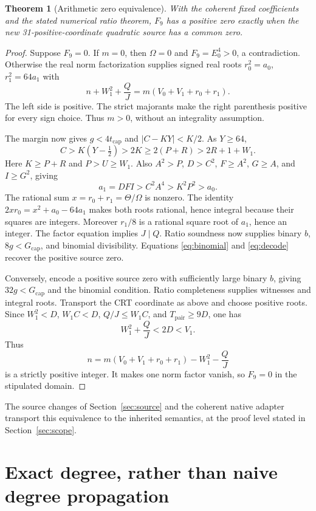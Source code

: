 \documentclass[11pt,a4paper]{article}
\newtheorem{theorem}{Theorem}
\theoremstyle{remark}
\newcommand{\Gcap}{G_{\mathrm{cap}}}
\begin{document}
\begin{theorem}[Arithmetic zero equivalence]
\label{thm:arith}
With the coherent fixed coefficients and the stated numerical ratio
theorem, \(F_9\) has a positive zero exactly when the new
31-positive-coordinate quadratic source has a common zero.
\end{theorem}
\begin{proof}
Suppose \(F_9=0\). If \(m=0\), then \(\Omega=0\) and
\(F_9=E_0^4>0\), a contradiction. Otherwise the real norm
factorization supplies signed real roots
\(r_0^2=a_0\), \(r_1^2=64a_1\) with
\[
 n+W_1^2+\frac QJ=m(V_0+V_1+r_0+r_1).
\]
The left side is positive. The strict majorants make the right
parenthesis positive for every sign choice. Thus \(m>0\), without
an integrality assumption.

The margin now gives \(g<4t_{\mathrm{cap}}\) and
\(|C-KY|<K/2\). As \(Y\ge64\),
\[
 C>K(Y-\tfrac12)>2K\ge2(P+R)>2R+1+W_1.
\]
Here \(K\ge P+R\) and \(P>U\ge W_1\).
Also \(A^2>P\), \(D>C^2\), \(F\ge A^2\), \(G\ge A\),
and \(I\ge G^2\), giving
\[
 a_1=DFI>C^2A^4>K^2P^2>a_0 .
\]
The rational sum \(x=r_0+r_1=\Theta/\Omega\) is nonzero.
The identity \(2xr_0=x^2+a_0-64a_1\) makes both roots rational,
hence integral because their squares are integers.
Moreover \(r_1/8\) is a rational square root of \(a_1\), hence an
integer. The factor equation implies \(J\mid Q\). Ratio soundness
now supplies binary \(b\), \(8g<\Gcap\), and binomial divisibility.
Equations \eqref{eq:binomial} and \eqref{eq:decode} recover the
positive source zero.

Conversely, encode a positive source zero with sufficiently large
binary \(b\), giving \(32g<\Gcap\) and the binomial condition.
Ratio completeness supplies witnesses and integral roots.
Transport the CRT coordinate as above and choose positive roots.
Since \(W_1^2<D\), \(W_1C<D\), \(Q/J\le W_1C\), and
\(T_{\mathrm{pair}}\ge9D\), one has
\[
 W_1^2+\frac QJ<2D<V_1 .
\]
Thus
\[
 n=m(V_0+V_1+r_0+r_1)-W_1^2-\frac QJ
\]
is a strictly positive integer. It makes one norm factor vanish,
so \(F_9=0\) in the stipulated domain.
\end{proof}
The source changes of Section~\ref{sec:source} and the coherent native
adapter transport this equivalence to the inherited semantics, at
the proof level stated in Section~\ref{sec:scope}.

\section{Exact degree, rather than naive degree propagation}
\label{sec:degree}
\end{document}
